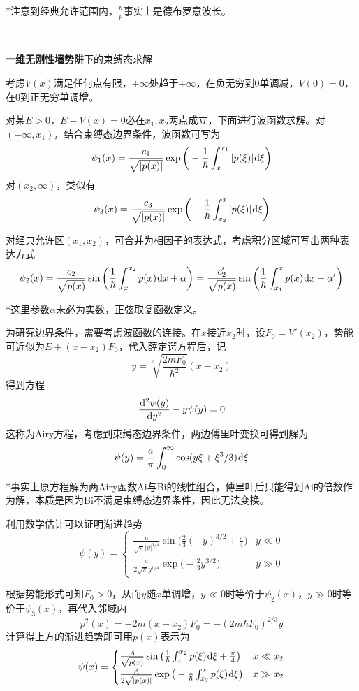 \documentclass[a4paper,UTF8,fontset=windows]{ctexart}
\newcommand*{\dr}{\hspace{0.07em}\mathrm{d}}
\begin{document}
*注意到经典允许范围内，$\frac{\hbar}{p}$事实上是德布罗意波长。

\

\textbf{一维无刚性墙势阱}下的束缚态求解

考虑$V(x)$满足任何点有限，$\pm\infty$处趋于$+\infty$，在负无穷到0单调减，$V(0)=0$，在0到正无穷单调增。

对某$E>0$，$E-V(x)=0$必在$x_1,x_2$两点成立，下面进行波函数求解。对$(-\infty,x_1)$，结合束缚态边界条件，波函数可写为
$$\psi_1(x)=\frac{c_1}{\sqrt{|p(x)|}}\exp\bigg(-\frac{1}{\hbar}\int_x^{x_1}|p(\xi)|\dr\xi\bigg)$$
对$(x_2,\infty)$，类似有
$$\psi_3(x)=\frac{c_3}{\sqrt{|p(x)|}}\exp\bigg(-\frac{1}{\hbar}\int_{x_2}^x|p(\xi)|\dr\xi\bigg)$$

对经典允许区$(x_1,x_2)$，可合并为相因子的表达式，考虑积分区域可写出两种表达方式
$$\psi_2(x)=\frac{c_2}{\sqrt{p(x)}}\sin\bigg(\frac{1}{\hbar}\int_x^{x_2}p(x)\dr x+\alpha\bigg)=\frac{c_2'}{\sqrt{p(x)}}\sin\bigg(\frac{1}{\hbar}\int_{x_1}^xp(x)\dr x+\alpha'\bigg)$$

*这里参数$\alpha$未必为实数，正弦取复函数定义。

为研究边界条件，需要考虑波函数的连接。在$x$接近$x_2$时，设$F_0=V'(x_2)$，势能可近似为$E+(x-x_2)F_0$，代入薛定谔方程后，记
$$y=\sqrt[3]{\frac{2mF_0}{\hbar^2}}(x-x_2)$$
得到方程
$$\frac{\dr^2\psi(y)}{\dr y^2}-y\psi(y)=0$$
这称为Airy方程，考虑到束缚态边界条件，两边傅里叶变换可得到解为
$$\psi(y)=\frac{a}{\pi}\int_0^\infty\cos(y\xi+\xi^3/3)\dr\xi$$

*事实上原方程解为两Airy函数Ai与Bi的线性组合，傅里叶后只能得到Ai的倍数作为解，本质是因为Bi不满足束缚态边界条件，因此无法变换。

利用数学估计可以证明渐进趋势
$$\psi(y)=\begin{cases}\frac{a}{\sqrt{\pi}|y|^{1/4}}\sin\big(\frac{2}{3}(-y)^{3/2}+\frac{\pi}{4}\big)&y\ll0\\\frac{a}{2\sqrt{\pi}y^{1/4}}\exp\big(-\frac{2}{3}y^{3/2}\big)&y\gg0\end{cases}$$

根据势能形式可知$F_0>0$，从而$y$随$x$单调增，$y\ll0$时等价于$\psi_2(x)$，$y\gg0$时等价于$\psi_3(x)$，再代入邻域内
$$p^2(x)=-2m(x-x_2)F_0=-(2m\hbar F_0)^{2/3}y$$
计算得上方的渐进趋势即可用$p(x)$表示为
$$\psi(x)=\begin{cases}\frac{A}{\sqrt{p(x)}}\sin\big(\frac{1}{\hbar}\int_x^{x_2}p(\xi)\dr\xi+\frac{\pi}{4}\big)&x\ll x_2\\\frac{A}{2\sqrt{|p(x)|}}\exp\big(-\frac{1}{\hbar}\int_{x_2}^xp(\xi)\dr\xi\big)&x\gg x_2\end{cases}$$
\end{document}
